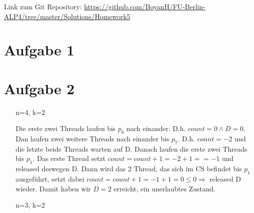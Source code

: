 \usepackage{graphicx}
\usepackage{amsmath}
\usepackage{amssymb}

\newcommand{\dozent}{Prof. Dr. Margarita Esponda}					%
\newcommand{\tutor}{Lilli Walter}						%
\newcommand{\tutoriumNo}{6}				%
\newcommand{\projectNo}{5}									%
\newcommand{\veranstaltung}{Nichtsequentielle Programmierung}	%
\newcommand{\semester}{SoeSe 2017}						%
\newcommand{\studenten}{Boyan Hristov, Sergelen Gongor}			%





Link zum Git Repository: \url{https://github.com/BoyanH/FU-Berlin-ALP4/tree/master/Solutions/Homework5}


\section*{Aufgabe 1}


\section*{Aufgabe 2}

\begin{enumerate}

\item[n=4, k=2]

Die erste zwei Threads laufen bis $p_8$ nach einander. D.h. $ count=0 \land D = 0$. Dan laufen zwei weitere Threads nach einander bis $p_7$. D.h. $count=-2$ und die letzte beide Threads warten auf D. Danach laufen die erste zwei Threads bis $p_1$. Das erste Thread setzt $count = count + 1 = -2 + 1 = =-1$ und released deswegen D. Dann wird das 2 Thread, das sich im CS befindet bis $p_1$ ausgeführt, setzt dabei $count = count+1 = -1 + 1 = 0 \leq 0 \Rightarrow$ released D wieder. Damit haben wir $D=2$ erreicht, ein unerlaubtes Zustand. 

\item[n=3, k=2]

\end{enumerate}

